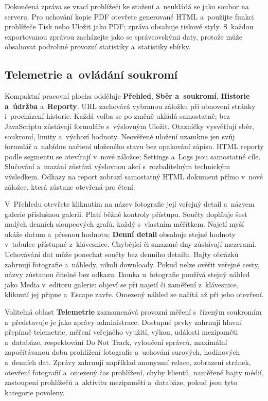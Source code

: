 \documentclass[11pt,a4paper]{article}
\newcommand{\ui}[1]{\textbf{#1}}
\begin{document}
Dokončená zpráva se vrací prohlížeči ke stažení a~neukládá se jako soubor na
serveru. Pro uchování kopie PDF otevřete generované HTML a~použijte funkci
prohlížeče Tisk nebo Uložit jako PDF; zpráva obsahuje tiskové styly. S~každou
exportovanou zprávou zacházejte jako se správcovskými daty, protože může
obsahovat podrobné provozní statistiky a~statistiky sbírky.

\subsection{Telemetrie a~ovládání soukromí}

Kompaktní pracovní plocha odděluje \ui{Přehled}, \ui{Sběr a~soukromí},
\ui{Historie a~údržba} a~\ui{Reporty}. URL zachovává vybranou záložku při
obnovení stránky i~procházení historie. Každá volba se po změně ukládá
samostatně; bez JavaScriptu zůstávají formuláře s~výslovným Uložit. Otazníčky
vysvětlují sběr, soukromí, limity a~výchozí hodnoty. Neověřené uložení uzamkne
jen svůj formulář a~nabídne načtení uloženého stavu bez opakování zápisu.
HTML reporty podle segmentu se otevírají v~nové záložce; Settings a~Logs jsou
samostatné cíle. Slučování a~mazání zůstává výslovnou akcí s~rozbalitelným
technickým výsledkem.
Odkazy na report zobrazí samostatný HTML dokument přímo v~nové záložce,
která zůstane otevřená pro čtení.

V~Přehledu otevřete kliknutím na název fotografie její veřejný detail a~názvem
galerie příslušnou galerii. Platí běžné kontroly přístupu. Součty doplňuje šest
malých denních sloupcových grafů, každý s~vlastním měřítkem. Najetí myší ukáže
datum a~přesnou hodnotu; \ui{Denní detail} obsahuje stejné hodnoty v~tabulce
přístupné z~klávesnice. Chybějící či smazané dny zůstávají mezerami. Uchovávání
dat může ponechat součty bez denního detailu. Bajty obrázků zahrnují fotografie
a~náhledy, nikoli downloady. Pokud nelze ověřit veřejné cesty, názvy zůstanou
čitelné bez odkazu.
Ikonka u~fotografie používá stejný náhled jako Media v~editoru galerie:
objeví se při najetí či zaměření z~klávesnice, kliknutí jej připne a~Escape
zavře. Omezený náhled se načítá až při jeho otevření.

Volitelná oblast \ui{Telemetrie} zaznamenává provozní měření s~řízeným soukromím
a~představuje je jako zprávy administrace. Dostupné prvky zahrnují hlavní
přepínač telemetrie, měření veřejného využití, výkon, události mezipaměti
a~databáze, respektování Do Not Track, vyloučení správců, maximální
započítávanou dobu prohlížení fotografie a~uchování surových, hodinových
a~denních dat. Zprávy zahrnují například anonymní relace, zobrazení stránek,
otevření fotografií a~omezený čas prohlížení, chyby klientů, naměřené bajty
médií, zastoupení prohlížečů a~aktivitu mezipaměti a~databáze, pokud jsou tyto
kategorie povoleny.
\end{document}
